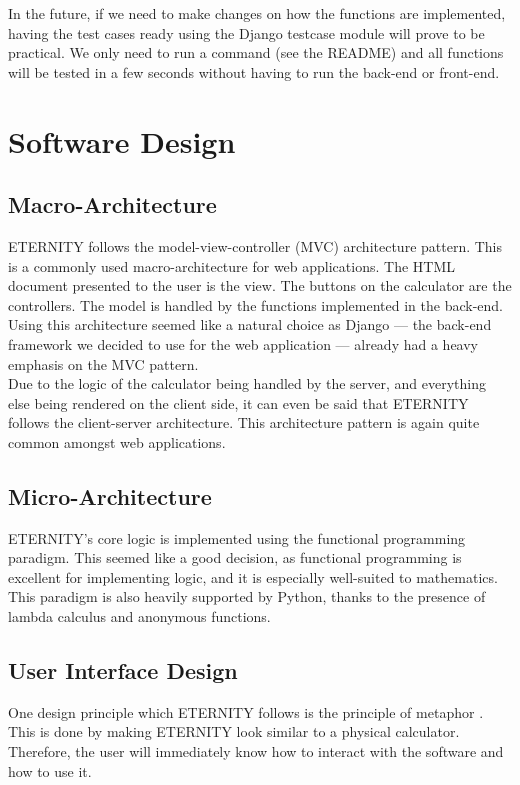 \documentclass[11pt,onside]{report}
\begin{document}
In the future, if we need to make changes on how the functions are implemented, having the test cases ready using the Django testcase module will prove to be practical. We only need to run a command (see the README) and all functions will be tested in a few seconds without having to run the back-end or front-end. 

\section{Software Design}

\subsection{Macro-Architecture}

ETERNITY follows the model-view-controller (MVC) architecture pattern. This is a commonly used macro-architecture for web applications. The HTML document presented to the user is the view. The buttons on the calculator are the controllers. The model is handled by the functions implemented in the back-end. Using this architecture seemed like a natural choice as Django — the back-end framework we decided to use for the web application — already had a heavy emphasis on the MVC pattern. \\

Due to the logic of the calculator being handled by the server, and everything else being rendered on the client side, it can even be said that ETERNITY follows the client-server architecture. This architecture pattern is again quite common amongst web applications.

\subsection{Micro-Architecture}

ETERNITY's core logic is implemented using the functional programming paradigm. This seemed like a good decision, as functional programming is excellent for implementing logic, and it is especially well-suited to mathematics. This paradigm is also heavily supported by Python, thanks to the presence of lambda calculus and anonymous functions.

\subsection{User Interface Design}

One design principle which ETERNITY follows is the principle of metaphor \cite{uid-principles}. This is done by making ETERNITY look similar to a physical calculator. Therefore, the user will immediately know how to interact with the software and how to use it. \\
\end{document}
